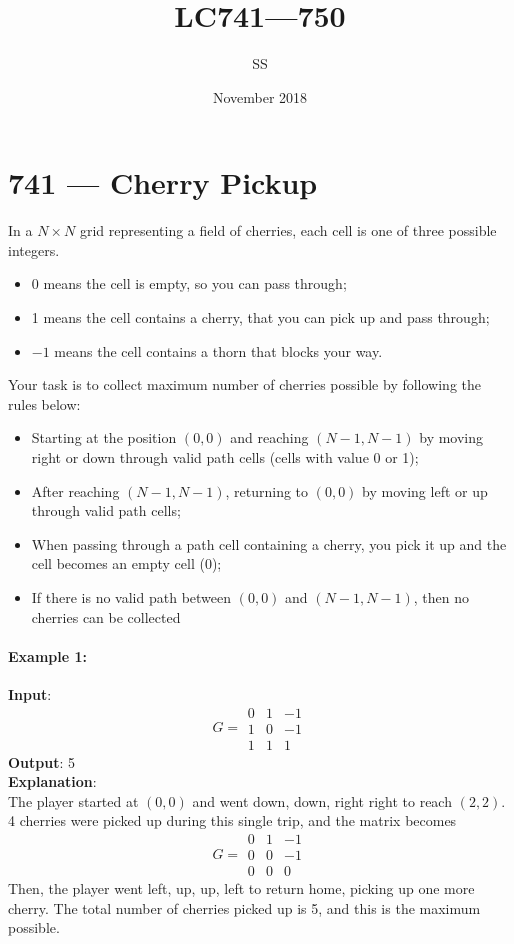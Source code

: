 \documentclass[a4paper,12pt]{article}
\title{LC741---750}
\author{SS}
\date{November 2018}
\begin{document}
\maketitle

\section{741 --- Cherry Pickup}
In a $N \times N$ grid representing a field of cherries, each cell is one of three possible integers.
\begin{itemize}
    \item 0 means the cell is empty, so you can pass through;
    \item 1 means the cell contains a cherry, that you can pick up and pass through;
    \item $-1$ means the cell contains a thorn that blocks your way.
\end{itemize}
Your task is to collect maximum number of cherries possible by following the rules below:
\begin{itemize}
    \item Starting at the position $(0, 0)$ and reaching $(N-1, N-1)$ by moving right or down through valid path cells (cells with value 0 or 1);
    \item After reaching $(N-1, N-1)$, returning to $(0, 0)$ by moving left or up through valid path cells;
    \item When passing through a path cell containing a cherry, you pick it up and the cell becomes an empty cell (0);
    \item If there is no valid path between $(0, 0)$ and $(N-1, N-1)$, then no cherries can be collected
\end{itemize}
\paragraph{Example 1:}
\begin{flushleft}
\textbf{Input}:
\[
G = \begin{array}{rrr}
0 & 1 &  -1 \\
1 & 0 & -1 \\
1 & 1 & 1
\end{array}
\]
\textbf{Output}: 5
\\
\textbf{Explanation}:
\\
The player started at $(0, 0)$ and went down, down, right right to reach $(2, 2)$.
\\
4 cherries were picked up during this single trip, and the matrix becomes
\[
G = \begin{array}{rrr}
0 & 1 &  -1 \\
0 & 0 & -1 \\
0 & 0 & 0
\end{array}
\]
Then, the player went left, up, up, left to return home, picking up one more cherry.
The total number of cherries picked up is 5, and this is the maximum possible.
\end{flushleft}
\end{document}
